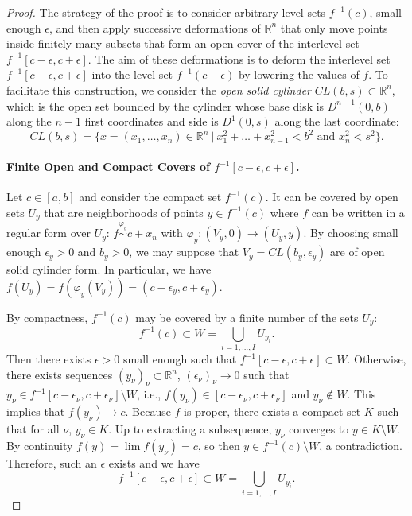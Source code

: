 \documentclass[11pt]{article}
\newcommand{\R}{\mathbb{R}}
\newcommand{\eps}{\epsilon}
\theoremstyle{plain}
\theoremstyle{definition}
\theoremstyle{remark}
\begin{document}
\begin{proof}
The strategy of the proof is to consider arbitrary level sets $f^{-1}(c)$, small enough $\eps$, and then apply successive deformations of $\R^n$ that only move points inside finitely many subsets that form an open cover of the interlevel set $f^{-1}[c-\eps, c+ \eps]$. The aim of these deformations is to deform the interlevel set $f^{-1}[c-\eps, c+ \eps]$ into the level set $f^{-1}(c-\eps)$ by lowering the values of $f$. To facilitate this construction, we consider the \emph{open solid cylinder} $CL(b,s) \subset \R^n$, which is the open set bounded by the cylinder whose base disk is $D^{n-1}(0, b)$ along the $n-1$ first coordinates and side is $D^1(0, s)$ along the last coordinate: 
\[ CL(b,s) = \{x = (x_1,\ldots, x_n) \in \R^n ~|~ x_1^2 + \ldots + x_{n-1}^2 < b^2 \text{ and } x_n^2 < s^2 \}.\] 

\paragraph{Finite Open and Compact Covers of $f^{-1}[c-\eps, c+ \eps]$.}
Let $c \in [a,b]$ and consider the compact set $f^{-1}(c)$.
It can be covered by open sets $U_{y}$ that are neighborhoods of points $y \in f^{-1}(c)$ where $f$ can be written in a regular form over $U_y$: 
$f \overset{\varphi_y}{\sim} c + x_n$ with $\varphi_y : (V_y, 0) \to (U_y, y)$.
By choosing small enough $\eps_y > 0$ and $b_y > 0$, we may suppose that $V_y = CL(b_y, \eps_y)$ are of open solid cylinder form. In particular, we have $f(U_y) = f(\varphi_y(V_y)) = (c-\eps_y, c+\eps_y)$.

By compactness, $f^{-1}(c)$ may be covered by a finite number of the sets $U_y$:
\[f^{-1}(c) \subset W = \bigcup\limits_{i = 1, \ldots, I} U_{y_i}.\]
Then there exists $\eps > 0$ small enough such that $f^{-1}[c-\eps, c+ \eps] \subset W$. Otherwise, there exists sequences $(y_\nu)_\nu \subset \R^n$, $(\eps_\nu)_\nu \to 0$ such that $y_\nu \in f^{-1}[c-\eps_\nu, c+ \eps_\nu] \setminus W$, i.e., $f(y_\nu) \in [c-\eps_\nu, c+ \eps_\nu]$ and $y_\nu \notin W$. This implies that $f(y_\nu) \to c$. Because $f$ is proper, there exists a compact set $K$ such that for all $\nu$, $y_\nu \in K$. Up to extracting a subsequence, $y_\nu$ converges to $y \in K \setminus W$. By continuity $f(y) = \lim f(y_\nu) = c$, so then $y \in f^{-1}(c) \setminus W$, a contradiction. Therefore, such an $\eps$ exists and we have
\begin{equation}
	\label{eq:open_covering}
f^{-1}[c-\eps, c+ \eps] \subset W = \bigcup\limits_{i = 1, \ldots, I} U_{y_i}.
\end{equation}


\end{proof}
\end{document}
